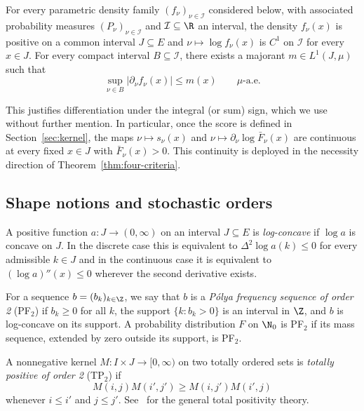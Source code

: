 \documentclass[11pt]{article}
\begin{document}
\begin{assumption}
\label{asm:diff-under-integral}
For every parametric density family \((f_\nu)_{\nu\in\mathcal I}\) considered below, with associated probability measures \((P_\nu)_{\nu\in\mathcal I}\) and \(\mathcal I\subseteq\R\) an interval, the density \(f_\nu(x)\) is positive on a common interval \(J\subseteq E\) and \(\nu \mapsto\log f_\nu(x)\) is \(C^1\) on \(\mathcal I\) for every \(x\in J\). For every compact interval \(B\subseteq\mathcal I\), there exists a majorant \(m\in L^1(J,\mu)\) such that
\[
\sup_{\nu\in B}\bigl|\partial_\nu f_\nu(x)\bigr|\le m(x)
\qquad \mu\text{-a.e.}
\]
\end{assumption}
This justifies differentiation under the integral (or sum) sign, which we use without further mention. In particular, once the score is defined in Section~\ref{sec:kernel}, the maps \(\nu\mapsto s_\nu(x)\) and \(\nu\mapsto \partial_\nu\log\bar F_\nu(x)\) are continuous at every fixed \(x\in J\) with \(\bar F_\nu(x)>0\). This continuity is deployed in the necessity direction of Theorem~\ref{thm:four-criteria}.

\subsection{Shape notions and stochastic orders}\label{subsec:orders}
\begin{defn}
A positive function \(a:J\to(0,\infty)\) on an interval \(J\subseteq E\) is \emph{log-concave} if \(\log a\) is concave on \(J\). In the discrete case this is equivalent to \(\Delta^2\log a(k)\le0\) for every admissible \(k\in J\) and in the continuous case it is equivalent to \((\log a)''(x)\le0\) wherever the second derivative exists.

For a sequence \(b=(b_k)_{k\in\Z}\), we say that \(b\) is a \emph{P\'olya frequency sequence of order 2} (PF$_2$) if \(b_k\ge0\) for all \(k\), the support \(\{k:b_k>0\}\) is an interval in \(\Z\), and \(b\) is log-concave on its support.  A probability distribution \(F\) on \(\N_0\) is PF$_2$ if its mass sequence, extended by zero outside its support, is PF$_2$.

A nonnegative kernel \(M:I\times J\to[0,\infty)\) on two totally ordered sets is \emph{totally positive of order 2} (TP$_2$) if
\[
M(i,j)M(i',j')\ge M(i,j')M(i',j)
\]
whenever \(i\le i'\) and \(j\le j'\). See~\cite{Karlin1968} for the general total positivity theory.
\end{defn}
\end{document}
